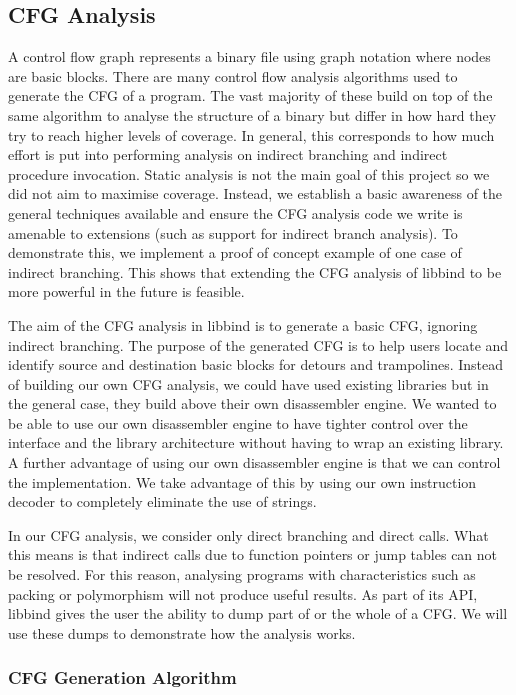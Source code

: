 \subsection{CFG Analysis}

A control flow graph represents a binary file using graph notation where nodes are basic blocks. There are many control flow analysis algorithms used to generate the CFG of a program. The vast majority of these build on top of the same algorithm to analyse the structure of a binary but differ in how hard they try to reach higher levels of coverage. In general, this corresponds to how much effort is put into performing analysis on indirect branching and indirect procedure invocation\cite{cfg}. Static analysis is not the main goal of this project so we did not aim to maximise coverage. Instead, we establish a basic awareness of the general techniques available and ensure the CFG analysis code we write is amenable to extensions (such as support for indirect branch analysis). To demonstrate this, we implement a proof of concept example of one case of indirect branching. This shows that extending the CFG analysis of libbind to be more powerful in the future is feasible.

The aim of the CFG analysis in libbind is to generate a basic CFG, ignoring indirect branching. The purpose of the generated CFG is to help users locate and identify source and destination basic blocks for detours and trampolines. Instead of building our own CFG analysis, we could have used existing libraries but in the general case, they build above their own disassembler engine. We wanted to be able to use our own disassembler engine to have tighter control over the interface and the library architecture without having to wrap an existing library. A further advantage of using our own disassembler engine is that we can control the implementation. We take advantage of this by using our own instruction decoder to completely eliminate the use of strings.

In our CFG analysis, we consider only direct branching and direct calls. What this means is that indirect calls due to function pointers or jump tables can not be resolved. For this reason, analysing programs with characteristics such as packing or polymorphism will not produce useful results. As part of its API, libbind gives the user the ability to dump part of or the whole of a CFG. We will use these dumps to demonstrate how the analysis works.

\subsubsection{CFG Generation Algorithm}

